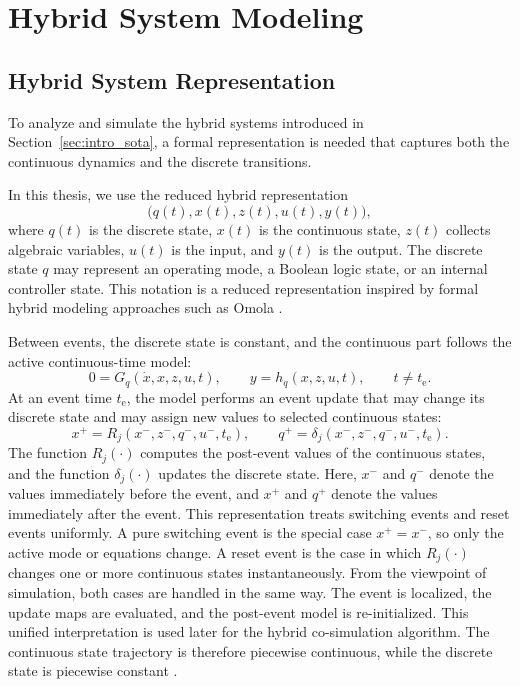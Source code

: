 \section{Hybrid System Modeling}
\label{sec:22_hybrid_system}

\subsection{Hybrid System Representation}
\label{sec:221_hybrid_system_representation}

To analyze and simulate the hybrid systems introduced in Section~\ref{sec:intro_sota}, a formal representation is needed that captures both the continuous dynamics and the discrete transitions.

In this thesis, we use the reduced hybrid representation
\begin{equation}
    \Big(q(t), x(t), z(t), u(t), y(t)\Big),
\end{equation}
where $q(t)$ is the discrete state, $x(t)$ is the continuous state, $z(t)$ collects algebraic variables, $u(t)$ is the input, and $y(t)$ is the output.
The discrete state $q$ may represent an operating mode, a Boolean logic state, or an internal controller state.
This notation is a reduced representation inspired by formal hybrid modeling approaches such as Omola \cite{andersson_omola_1990,andersson_object-oriented_1994}.

Between events, the discrete state is constant, and the continuous part follows the active continuous-time model:
\begin{equation}
    0 = G_{q}\!\left(\dot{x}, x, z, u, t\right),
    \qquad
    y = h_{q}\!\left(x, z, u, t\right),
    \qquad t \neq t_\mathrm{e} .
\end{equation}
At an event time $t_\mathrm{e}$, the model performs an event update that may change its discrete state and may assign new values to selected continuous states:
\begin{equation}
    x^{+} = R_j\!\left(x^{-}, z^{-}, q^{-}, u^{-}, t_\mathrm{e}\right),
    \qquad
    q^{+} = \delta_j\!\left(x^{-}, z^{-}, q^{-}, u^{-}, t_\mathrm{e}\right).
\end{equation}
The function $R_j(\cdot)$ computes the post-event values of the continuous states, and the function $\delta_j(\cdot)$ updates the discrete state.
Here, $x^{-}$ and $q^{-}$ denote the values immediately before the event, and $x^{+}$ and $q^{+}$ denote the values immediately after the event.
This representation treats switching events and reset events uniformly.
A pure switching event is the special case $x^{+} = x^{-}$, so only the active mode or equations change.
A reset event is the case in which $R_j(\cdot)$ changes one or more continuous states instantaneously.
From the viewpoint of simulation, both cases are handled in the same way.
The event is localized, the update maps are evaluated, and the post-event model is re-initialized.
This unified interpretation is used later for the hybrid co-simulation algorithm.
The continuous state trajectory is therefore piecewise continuous, while the discrete state is piecewise constant \cite{van_der_schaft_introduction_2000,branicky_general_1995}.

